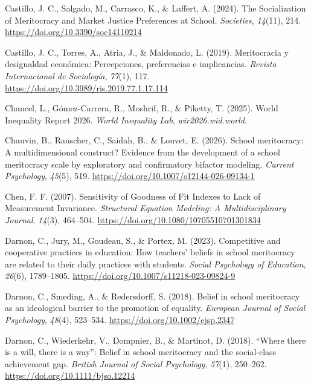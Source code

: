 \documentclass[
  13pt,
]{article}
\newlength{\cslhangindent}
\newenvironment{CSLReferences}[2] %
 {\begin{list}{}{%
  \setlength{\itemindent}{0pt}
  \setlength{\leftmargin}{0pt}
  \setlength{\parsep}{0pt}
  \ifodd #1
   \setlength{\leftmargin}{\cslhangindent}
   \setlength{\itemindent}{-1\cslhangindent}
  \fi
  \setlength{\itemsep}{#2\baselineskip}}}
 {\end{list}}
\begin{document}
\begin{CSLReferences}{1}{0}
Castillo, J. C., Salgado, M., Carrasco, K., \& Laffert, A. (2024). The
{Socialization} of {Meritocracy} and {Market Justice Preferences} at
{School}. \emph{Societies}, \emph{14}(11), 214.
\url{https://doi.org/10.3390/soc14110214}

Castillo, J. C., Torres, A., Atria, J., \& Maldonado, L. (2019).
Meritocracia y desigualdad económica: {Percepciones}, preferencias e
implicancias. \emph{Revista Internacional de Sociología}, \emph{77}(1),
117. \url{https://doi.org/10.3989/ris.2019.77.1.17.114}

Chancel, L., Gómez-Carrera, R., Moshrif, R., \& Piketty, T. (2025).
World {Inequality Report} 2026. \emph{World Inequality Lab},
\emph{wir2026.wid.world}.

Chauvin, B., Rauscher, C., Saidah, B., \& Louvet, E. (2026). School
meritocracy: A multidimensional construct? {Evidence} from the
development of a school meritocracy scale by exploratory and
confirmatory bifactor modeling. \emph{Current Psychology}, \emph{45}(5),
519. \url{https://doi.org/10.1007/s12144-026-09134-1}

Chen, F. F. (2007). Sensitivity of {Goodness} of {Fit Indexes} to {Lack}
of {Measurement Invariance}. \emph{Structural Equation Modeling: A
Multidisciplinary Journal}, \emph{14}(3), 464--504.
\url{https://doi.org/10.1080/10705510701301834}

Darnon, C., Jury, M., Goudeau, S., \& Portex, M. (2023). Competitive and
cooperative practices in education: {How} teachers' beliefs in school
meritocracy are related to their daily practices with students.
\emph{Social Psychology of Education}, \emph{26}(6), 1789--1805.
\url{https://doi.org/10.1007/s11218-023-09824-9}

Darnon, C., Smeding, A., \& Redersdorff, S. (2018). Belief in school
meritocracy as an ideological barrier to the promotion of equality.
\emph{European Journal of Social Psychology}, \emph{48}(4), 523--534.
\url{https://doi.org/10.1002/ejsp.2347}

Darnon, C., Wiederkehr, V., Dompnier, B., \& Martinot, D. (2018).
{``{Where} there is a will, there is a way''}: {Belief} in school
meritocracy and the social-class achievement gap. \emph{British Journal
of Social Psychology}, \emph{57}(1), 250--262.
\url{https://doi.org/10.1111/bjso.12214}


\end{CSLReferences}
\end{document}
